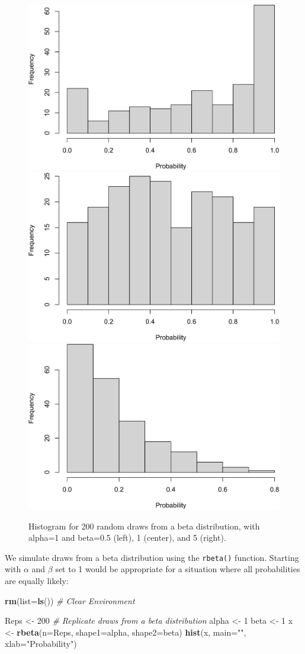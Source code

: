 \documentclass[
]{krantz}
\makeatletter
\newenvironment{Shaded}{\begin{snugshade}}{\end{snugshade}}
\newcommand{\AttributeTok}[1]{\textcolor[rgb]{0.27,0.27,0.27}{#1}}
\newcommand{\CommentTok}[1]{\textcolor[rgb]{0.37,0.37,0.37}{\textit{#1}}}
\newcommand{\DecValTok}[1]{\textcolor[rgb]{0.06,0.06,0.06}{#1}}
\newcommand{\FunctionTok}[1]{\textcolor[rgb]{0.27,0.27,0.27}{\textbf{#1}}}
\newcommand{\NormalTok}[1]{#1}
\newcommand{\OtherTok}[1]{\textcolor[rgb]{0.37,0.37,0.37}{#1}}
\newcommand{\StringTok}[1]{\textcolor[rgb]{0.5,0.5,0.5}{#1}}
\newenvironment{kframe}{%
\medskip{}
\setlength{\fboxsep}{.8em}
 \def\at@end@of@kframe{}%
 \ifinner\ifhmode%
  \def\at@end@of@kframe{\end{minipage}}%
  \begin{minipage}{\columnwidth}%
 \fi\fi%
 \def\FrameCommand##1{\hskip\@totalleftmargin \hskip-\fboxsep
 \colorbox{shadecolor}{##1}\hskip-\fboxsep
     \hskip-\linewidth \hskip-\@totalleftmargin \hskip\columnwidth}%
 \MakeFramed {\advance\hsize-\width
   \@totalleftmargin\z@ \linewidth\hsize
   \@setminipage}}%
 {\par\unskip\endMakeFramed%
 \at@end@of@kframe}
\renewenvironment{Shaded}{\begin{kframe}}{\end{kframe}}
\makeatother
\begin{document}
\begin{figure}
\includegraphics[width=0.3\linewidth]{bookdown_files/figure-latex/Beta-1} \includegraphics[width=0.3\linewidth]{bookdown_files/figure-latex/Beta-2} \includegraphics[width=0.3\linewidth]{bookdown_files/figure-latex/Beta-3} \caption{Histogram for 200 random draws from a beta distribution, with alpha=1 and beta=0.5  (left), 1 (center), and 5 (right).}\label{fig:Beta}
\end{figure}

We simulate draws from a beta distribution using the \texttt{rbeta()} function. Starting with \(\alpha\) and \(\beta\) set to 1 would be appropriate for a situation where all probabilities are equally likely:

\begin{Shaded}
\begin{Highlighting}[]
\FunctionTok{rm}\NormalTok{(}\AttributeTok{list=}\FunctionTok{ls}\NormalTok{()) }\CommentTok{\# Clear Environment}

\NormalTok{Reps }\OtherTok{\textless{}{-}} \DecValTok{200} \CommentTok{\# Replicate draws from a beta distribution}
\NormalTok{alpha }\OtherTok{\textless{}{-}} \DecValTok{1}
\NormalTok{beta }\OtherTok{\textless{}{-}} \DecValTok{1}
\NormalTok{x }\OtherTok{\textless{}{-}} \FunctionTok{rbeta}\NormalTok{(}\AttributeTok{n=}\NormalTok{Reps, }\AttributeTok{shape1=}\NormalTok{alpha, }\AttributeTok{shape2=}\NormalTok{beta)}
\FunctionTok{hist}\NormalTok{(x, }\AttributeTok{main=}\StringTok{""}\NormalTok{, }\AttributeTok{xlab=}\StringTok{"Probability"}\NormalTok{)}
\end{Highlighting}
\end{Shaded}
\end{document}
